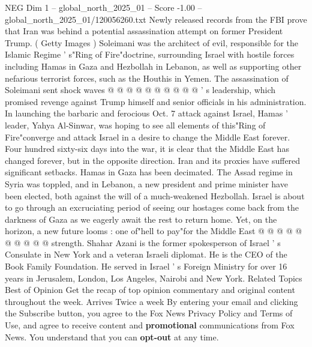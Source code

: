 \begin{textsample}{NEG Dim 1 – global\_north\_2025\_01 – Score -1.00 – global\_north\_2025\_01/120056260.txt}
Newly released records from the FBI prove that Iran was behind a potential assassination attempt on former President Trump. ( Getty Images ) Soleimani was the architect of evil, responsible for the Islamic Regime ' s"Ring of Fire"doctrine, surrounding Israel with hostile forces including Hamas in Gaza and Hezbollah in Lebanon, as well as supporting other nefarious terrorist forces, such as the Houthis in Yemen.
The assassination of Soleimani sent shock waves @ @ @ @ @ @ @ @ @ @ ' s leadership, which promised revenge against Trump himself and senior officials in his administration.
In launching the barbaric and ferocious Oct. 7 attack against Israel, Hamas ' leader, Yahya Al-Sinwar, was hoping to see all elements of this"Ring of Fire"converge and attack Israel in a desire to change the Middle East forever.
Four hundred sixty-six days into the war, it is clear that the Middle East has changed forever, but in the opposite direction.
Iran and its proxies have suffered significant setbacks.
Hamas in Gaza has been decimated.
The Assad regime in Syria was toppled, and in Lebanon, a new president and prime minister have been elected, both against the will of a much-weakened Hezbollah.
Israel is about to go through an excruciating period of seeing our hostages come back from the darkness of Gaza as we eagerly await the rest to return home.
Yet, on the horizon, a new future looms : one of"hell to pay"for the Middle East @ @ @ @ @ @ @ @ @ @ strength.
Shahar Azani is the former spokesperson of Israel ' s Consulate in New York and a veteran Israeli diplomat.
He is the CEO of the Book Family Foundation.
He served in Israel ' s Foreign Ministry for over 16 years in Jerusalem, London, Los Angeles, Nairobi and New York.
Related Topics Best of Opinion Get the recap of top opinion commentary and original content throughout the week.
Arrives Twice a week By entering your email and clicking the Subscribe button, you agree to the Fox News Privacy Policy and Terms of Use, and agree to receive content and \textbf{promotional} communications from Fox News.
You understand that you can \textbf{opt-out} at any time.

\end{textsample}
